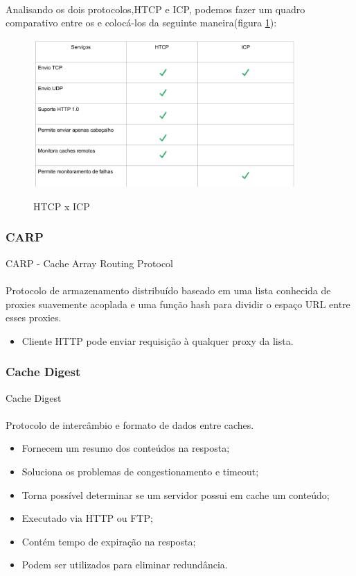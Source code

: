 \paragraph{} Analisando os dois protocolos,HTCP e ICP, podemos fazer um quadro comparativo entre os e coloc\'a-los da seguinte maneira(figura \ref{figura:htcp_x_icp}):

\begin{figure}[h]
\caption{HTCP x ICP}
\includegraphics[width=10cm]{Figuras/htcp_x_icp.png} 
\label{figura:htcp_x_icp}
\end{figure}

\subsubsection{CARP}
\label{section:CARP}
CARP -  Cache Array Routing Protocol
\paragraph{} Protocolo de armazenamento distribu\'ido baseado em uma lista conhecida de proxies suavemente acoplada e uma fun\c{c}\~ao hash para dividir o espa\c{c}o URL entre esses proxies.
\begin{itemize}
\item Cliente HTTP pode enviar requisi\c{c}\~ao \`a qualquer proxy da lista.
\end{itemize}

\subsubsection{Cache Digest}
\label{section:Cache Digest}
Cache Digest
\paragraph{} Protocolo de interc\^ambio e formato de dados entre caches.
\begin{itemize}
\item Fornecem um resumo dos conte\'udos na resposta;
\item Soluciona os problemas de congestionamento e timeout;
\item Torna poss\'ivel determinar se um servidor possui em cache um conte\'udo;
\item Executado via HTTP ou FTP;
\item Cont\'em tempo de expira\c{c}\~ao na resposta;
\item Podem ser utilizados para eliminar redund\^ancia.
\end{itemize}
